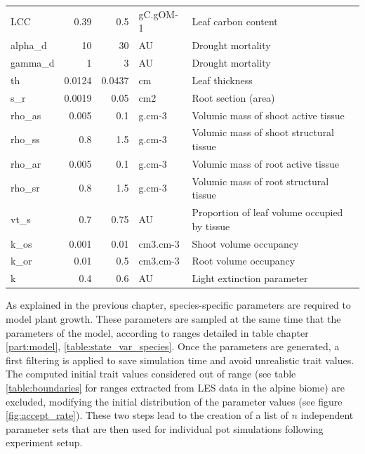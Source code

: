 \begin{table2*}
\begin{tabular}{lrrll}
LCC         & 0.39    & 0.5    & gC.gOM-1                     & Leaf carbon content                                \\
alpha\_d    & 10      & 30     & AU                           & Drought mortality                                  \\
gamma\_d    & 1       & 3      & AU                           & Drought mortality                                  \\
th          & 0.0124  & 0.0437 & cm                           & Leaf thickness                                     \\
s\_r        & 0.0019  & 0.05   & cm2                          & Root section (area)                                \\
rho\_as     & 0.005   & 0.1    & g.cm-3                       & Volumic mass of shoot active tissue                \\
rho\_ss     & 0.8     & 1.5    & g.cm-3                       & Volumic mass of shoot structural tissue            \\
rho\_ar     & 0.005   & 0.1    & g.cm-3                       & Volumic mass of root active tissue                 \\
rho\_sr     & 0.8     & 1.5    & g.cm-3                       & Volumic mass of root structural tissue             \\
vt\_s       & 0.7     & 0.75   & AU                           & Proportion of leaf volume occupied by tissue \\
k\_os       & 0.001   & 0.01   & cm3.cm-3                     & Shoot volume occupancy                             \\
k\_or       & 0.01    & 0.5    & cm3.cm-3                     & Root volume occupancy                              \\
k           & 0.4     & 0.6    & AU                           & Light extinction parameter                        
\end{tabular}
\vspace*{0.5cm}
\end{table2*}

As explained in the previous chapter, species-specific parameters are required to model plant growth. These parameters are sampled at the same time that the parameters of the model, according to ranges detailed in table chapter \ref{part:model}, \ref{table:state_var_species}. Once the parameters are generated, a first filtering is applied to save simulation time and avoid unrealistic trait values. The computed initial trait values considered out of range (see table \ref{table:boundaries} for ranges extracted from LES data \parencite{wright_worldwide_2004} in the alpine biome) are excluded, modifying the initial distribution of the parameter values (see figure \ref{fig:accept_rate}). These two steps lead to the creation of a list of $n$ independent parameter sets that are then used for individual pot simulations following \citet{peterson_growth_1982} experiment setup.
\\


